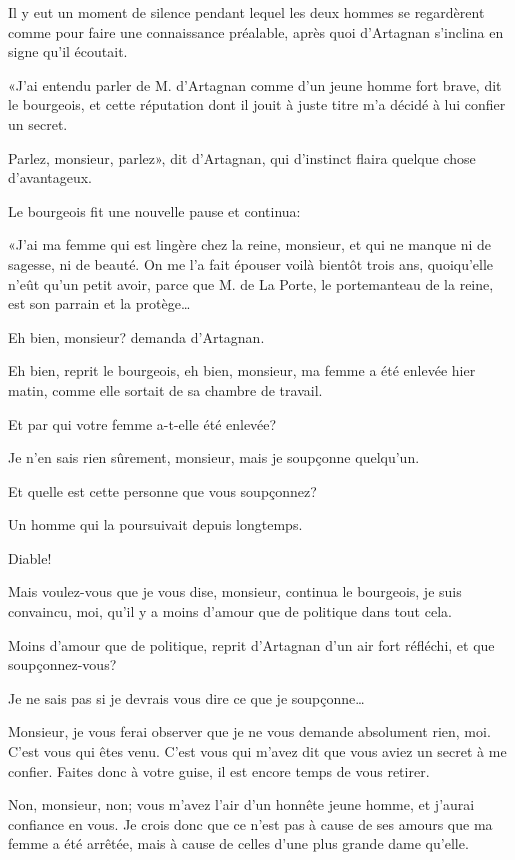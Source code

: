 Il y eut un moment de silence pendant lequel les deux hommes se regardèrent comme pour faire une connaissance préalable, après quoi d'Artagnan s'inclina en signe qu'il écoutait. 

«J'ai entendu parler de M. d'Artagnan comme d'un jeune homme fort brave, dit le bourgeois, et cette réputation dont il jouit à juste titre m'a décidé à lui confier un secret. 

\speak  Parlez, monsieur, parlez», dit d'Artagnan, qui d'instinct flaira quelque chose d'avantageux. 

Le bourgeois fit une nouvelle pause et continua: 

«J'ai ma femme qui est lingère chez la reine, monsieur, et qui ne manque ni de sagesse, ni de beauté. On me l'a fait épouser voilà bientôt trois ans, quoiqu'elle n'eût qu'un petit avoir, parce que M. de La Porte, le portemanteau de la reine, est son parrain et la protège\dots 

\speak  Eh bien, monsieur? demanda d'Artagnan. 

\speak  Eh bien, reprit le bourgeois, eh bien, monsieur, ma femme a été enlevée hier matin, comme elle sortait de sa chambre de travail. 

\speak  Et par qui votre femme a-t-elle été enlevée? 

\speak  Je n'en sais rien sûrement, monsieur, mais je soupçonne quelqu'un. 

\speak  Et quelle est cette personne que vous soupçonnez? 

\speak  Un homme qui la poursuivait depuis longtemps. 

\speak  Diable! 

\speak  Mais voulez-vous que je vous dise, monsieur, continua le bourgeois, je suis convaincu, moi, qu'il y a moins d'amour que de politique dans tout cela. 

\speak  Moins d'amour que de politique, reprit d'Artagnan d'un air fort réfléchi, et que soupçonnez-vous? 

\speak  Je ne sais pas si je devrais vous dire ce que je soupçonne\dots 

\speak  Monsieur, je vous ferai observer que je ne vous demande absolument rien, moi. C'est vous qui êtes venu. C'est vous qui m'avez dit que vous aviez un secret à me confier. Faites donc à votre guise, il est encore temps de vous retirer. 

\speak  Non, monsieur, non; vous m'avez l'air d'un honnête jeune homme, et j'aurai confiance en vous. Je crois donc que ce n'est pas à cause de ses amours que ma femme a été arrêtée, mais à cause de celles d'une plus grande dame qu'elle. 


